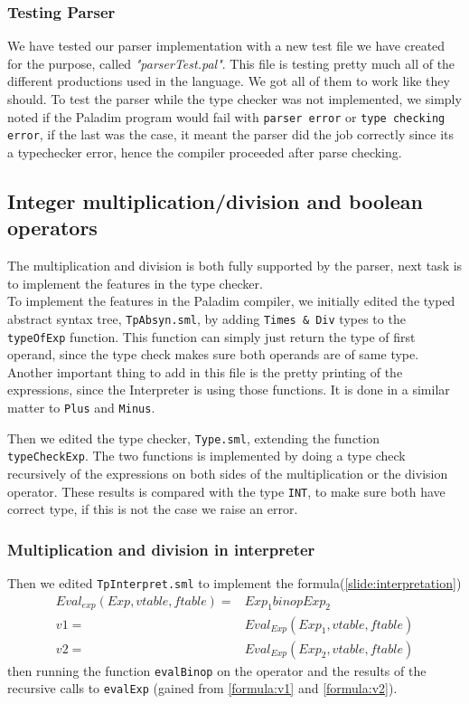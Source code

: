 \documentclass[10pt]{article}
\begin{document}
\subsubsection{Testing Parser}
We have tested our parser implementation with a new test file we have created for the purpose, called \textit{"parserTest.pal"}. This file is testing pretty much all of the different productions used in the language. We got all of them to work like they should. To test the parser while the type checker was not implemented, we simply noted if the Paladim program would fail with \texttt{parser error} or \texttt{type checking error}, if the last was the case, it meant the parser did the job correctly since its a typechecker error, hence the compiler proceeded after parse checking.

\subsection{Integer multiplication/division and boolean operators}
The multiplication and division is both fully supported by the parser, next task is to implement the features in the type checker.\\

To implement the features in the Paladim compiler, we initially edited the typed abstract syntax tree, \texttt{TpAbsyn.sml}, by adding \texttt{Times \& Div} types to the \texttt{typeOfExp} function. This function can simply just return the type of first operand, since the type check makes sure both operands are of same type. Another important thing to add in this file is the pretty printing of the expressions, since the Interpreter is using those functions. It is done in a similar matter to \texttt{Plus} and \texttt{Minus}.

Then we edited the type checker, \texttt{Type.sml}, extending the function \texttt{typeCheckExp}. The two functions is implemented by doing a type check recursively of the expressions on both sides of the multiplication or the division operator. These results is compared with the type \texttt{INT}, to make sure both have correct type, if this is not the case we raise an error.\\

\subsubsection{Multiplication and division in interpreter}
Then we edited \texttt{TpInterpret.sml} to implement the formula(\ref{slide:interpretation})
\begin{align}
Eval_{exp}(Exp, vtable, ftable) =& Exp_1 binop Exp_2\\
v1 =& Eval_{Exp} (Exp_1, vtable, ftable)\label{formula:v1}\\
v2 =& Eval_{Exp} (Exp_2, vtable, ftable)\label{formula:v2}
\end{align}
then running the function \texttt{evalBinop} on the operator and the results of the recursive calls to \texttt{evalExp} (gained from \ref{formula:v1} and \ref{formula:v2}).\\
\end{document}
